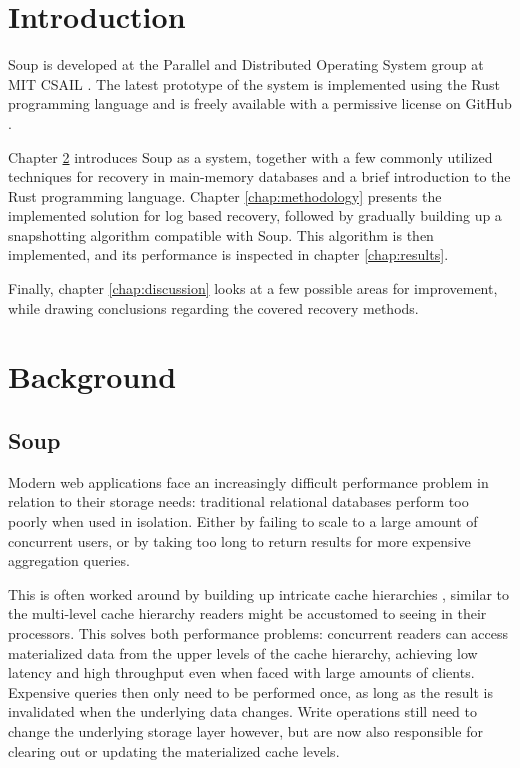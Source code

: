 \documentclass[b5paper]{report}
\begin{document}
\chapter{Introduction}
Soup is developed at the Parallel and Distributed Operating System group at
MIT CSAIL \cite{soup-web}. The latest prototype of the system is implemented using
the Rust programming language and is freely available with a permissive license
on GitHub \cite{distributary}.

Chapter \ref{chap:background} introduces Soup as a system, together with a few
commonly utilized techniques for recovery in main-memory databases and a brief
introduction to the Rust programming language. Chapter \ref{chap:methodology}
presents the implemented solution for log based recovery, followed by gradually
building up a snapshotting algorithm compatible with Soup. This algorithm is
then implemented, and its performance is inspected in chapter
\ref{chap:results}.

Finally, chapter \ref{chap:discussion} looks at a few possible areas for
improvement, while drawing conclusions regarding the covered recovery methods.

\chapter{Background} \label{chap:background}
\section{Soup}
Modern web applications face an increasingly difficult performance problem in
relation to their storage needs: traditional relational databases perform too
poorly when used in isolation. Either by failing to scale to a large amount of
concurrent users, or by taking too long to return results for more expensive
aggregation queries.

This is often worked around by building up intricate cache hierarchies
\cite{memcached}, similar to the multi-level cache hierarchy readers might be
accustomed to seeing in their processors. This solves both performance problems:
concurrent readers can access materialized data from the upper levels of the
cache hierarchy, achieving low latency and high throughput even when faced with
large amounts of clients. Expensive queries then only need to be performed once,
as long as the result is invalidated when the underlying data changes. Write
operations still need to change the underlying storage layer however, but are
now also responsible for clearing out or updating the materialized cache levels.
\end{document}
